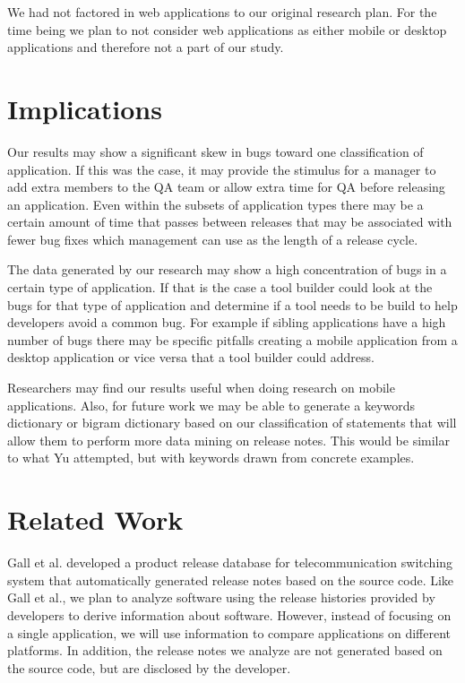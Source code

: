 \documentclass{acm_proc_article-sp}
\begin{document}
We had not factored in web applications to our original research plan. For the time being we plan to not consider web applications as either mobile or desktop applications and therefore not a part of our study.

\section{Implications}
 Our results may show a significant skew in bugs toward one classification of application. If this was the case, it may provide the stimulus for a manager to add extra members to the QA team or allow extra time for QA before releasing an application. 
Even within the subsets of application types there may be a certain amount of time that passes between releases that may be associated with fewer bug fixes which management can use as the length of a release cycle.

 The data generated by our research may show a high concentration of bugs in a certain type of application. 
If that is the case a tool builder could look at the bugs for that type of application and determine if a tool needs to be build to help developers avoid a common bug. 
For example if sibling applications have a high number of bugs there may be specific pitfalls creating a mobile application from a desktop application or vice versa that a tool builder could address.

 Researchers may find our results useful when doing research on mobile applications.
Also, for future work we may be able to generate a keywords dictionary or bigram dictionary based on our classification of statements that will allow them to perform more data mining on release notes.
This would be similar to what Yu \cite{YuChangeLogs} attempted, but with keywords drawn from concrete examples.


\section{Related Work}

Gall et al. \cite{GallSoftwareEv} developed a product release database for telecommunication switching system that automatically generated release notes based on the source code.
Like Gall et al., we plan to analyze software using the release histories provided by developers to derive information about software. 
However, instead of focusing on a single application, we will use information to compare applications on different platforms. 
In addition, the release notes we analyze are not generated based on the source code, but are disclosed by the developer.
\end{document}
